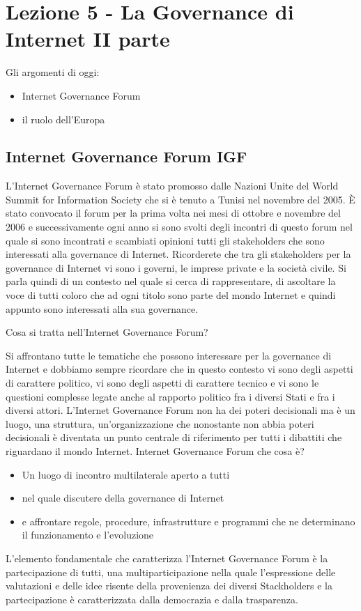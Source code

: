 \chapter{Lezione 5 - La Governance di Internet II parte}

Gli argomenti di oggi:

\begin{itemize}
    \item Internet Governance Forum
    \item il ruolo dell'Europa
\end{itemize}

\section{Internet Governance Forum IGF}

L'Internet Governance Forum è stato promosso dalle Nazioni Unite del World Summit for Information Society che si è tenuto a Tunisi nel novembre del 2005. È stato convocato il forum per la prima volta nei mesi di ottobre e novembre del 2006 e successivamente ogni anno si sono svolti degli incontri di questo forum nel quale si sono incontrati e scambiati opinioni tutti gli stakeholders che sono interessati alla governance di Internet. Ricorderete che tra gli stakeholders per la governance di Internet vi sono i governi, le imprese private e la società civile. Si parla quindi di un contesto nel quale si cerca di rappresentare, di ascoltare la voce di tutti coloro che ad ogni titolo sono parte del mondo Internet e quindi appunto sono interessati alla sua governance. \par
Cosa si tratta nell'Internet Governance Forum?\par
Si affrontano tutte le tematiche che possono interessare per la governance di Internet e dobbiamo sempre ricordare che in questo contesto vi sono degli aspetti di carattere politico, vi sono degli aspetti di carattere tecnico e vi sono le questioni complesse legate anche al rapporto politico fra i diversi Stati e fra i diversi attori. L'Internet Governance Forum non ha dei poteri decisionali ma è un luogo, una struttura, un'organizzazione che nonostante non abbia poteri decisionali è diventata un punto centrale di riferimento per tutti i dibattiti che riguardano il mondo Internet.
Internet Governance Forum che cosa è?
\begin{itemize}
    \item Un luogo di incontro multilaterale aperto a tutti
    \item nel quale discutere della governance di Internet
    \item e affrontare regole, procedure, infrastrutture e programmi che ne determinano il funzionamento e l'evoluzione
\end{itemize}
L'elemento fondamentale che caratterizza l'Internet Governance Forum è la partecipazione di tutti, una multiparticipazione nella quale l'espressione delle valutazioni e delle idee risente della provenienza dei diversi Stackholders e la partecipazione è caratterizzata dalla democrazia e dalla trasparenza. \par

